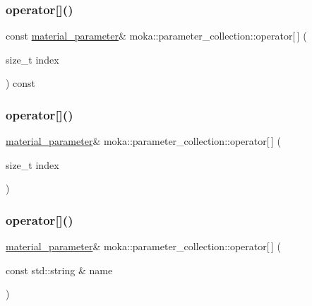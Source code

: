 \subsubsection{\texorpdfstring{operator[]()}{operator[]()}\hspace{0.1cm}{\footnotesize\ttfamily [1/3]}}
{\footnotesize\ttfamily const \mbox{\hyperlink{structmoka_1_1material__parameter}{material\+\_\+parameter}}\& moka\+::parameter\+\_\+collection\+::operator\mbox{[}$\,$\mbox{]} (\begin{DoxyParamCaption}\item[{size\+\_\+t}]{index }\end{DoxyParamCaption}) const}

\mbox{\label{classmoka_1_1parameter__collection_a0ffaa248546c9de9d9b8abf9bb125ad8}} 
\subsubsection{\texorpdfstring{operator[]()}{operator[]()}\hspace{0.1cm}{\footnotesize\ttfamily [2/3]}}
{\footnotesize\ttfamily \mbox{\hyperlink{structmoka_1_1material__parameter}{material\+\_\+parameter}}\& moka\+::parameter\+\_\+collection\+::operator\mbox{[}$\,$\mbox{]} (\begin{DoxyParamCaption}\item[{size\+\_\+t}]{index }\end{DoxyParamCaption})}

\mbox{\label{classmoka_1_1parameter__collection_a9053cc6ee2a14d347b3ca12b2a23f4b3}} 
\subsubsection{\texorpdfstring{operator[]()}{operator[]()}\hspace{0.1cm}{\footnotesize\ttfamily [3/3]}}
{\footnotesize\ttfamily \mbox{\hyperlink{structmoka_1_1material__parameter}{material\+\_\+parameter}}\& moka\+::parameter\+\_\+collection\+::operator\mbox{[}$\,$\mbox{]} (\begin{DoxyParamCaption}\item[{const std\+::string \&}]{name }\end{DoxyParamCaption})}

